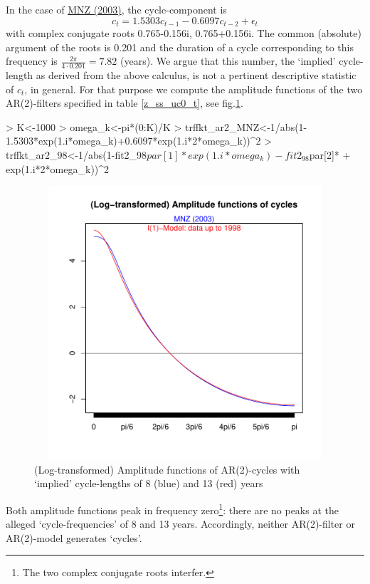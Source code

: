 \documentclass[a4paper]{book}
\begin{document}
In the case of \href{https://www.dropbox.com/s/1qn5h7s02c86j8i/mnz03.pdf?dl=0}{MNZ (2003)}, the cycle-component is
\[c_t=1.5303c_{t-1}-0.6097c_{t-2}+\epsilon_t\]
with complex conjugate roots 0.765-0.156i, 0.765+0.156i. The common (absolute) argument of the roots is 0.201 and the duration of a cycle corresponding to this frequency is $\frac{2\pi}{4\cdot0.201}=7.82$ (years). We argue that this number, the `implied' cycle-length as derived from the above calculus, is not a pertinent descriptive statistic of $c_t$, in general. For that purpose we compute the amplitude functions of the two AR(2)-filters specified in table \ref{z_ss_uc0_t}, see fig.\ref{z_effective_length}.
\begin{Schunk}
\begin{Sinput}
> K<-1000
> omega_k<-pi*(0:K)/K
> trffkt_ar2_MNZ<-1/abs(1-1.5303*exp(1.i*omega_k)+0.6097*exp(1.i*2*omega_k))^2
> trffkt_ar2_98<-1/abs(1-fit2_98$par[1]*exp(1.i*omega_k)-fit2_98$par[2]*
+                        exp(1.i*2*omega_k))^2
\end{Sinput}
\end{Schunk}
\begin{figure}[H]\begin{center}\includegraphics[height=4in, width=6in]{z_effective_length}\caption{(Log-transformed) Amplitude functions of AR(2)-cycles with `implied' cycle-lengths of 8 (blue) and 13  (red) years\label{z_effective_length}}\end{center}\end{figure}Both amplitude functions peak in frequency zero\footnote{The two complex conjugate roots interfer.}: there are no peaks at the alleged `cycle-frequencies' of 8 and 13 years. Accordingly, neither AR(2)-filter or AR(2)-model generates `cycles'. 
\end{document}
